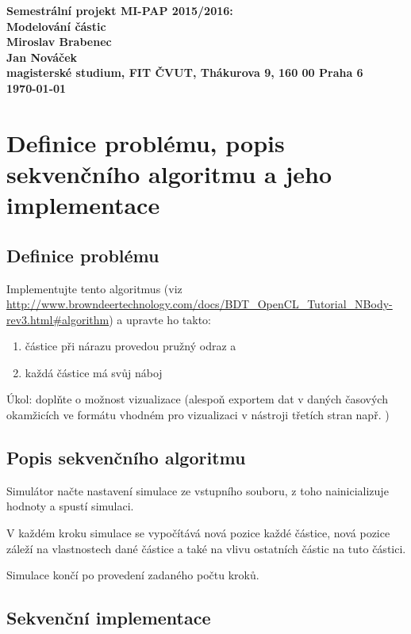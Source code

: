 \documentclass[12pt]{article}
\begin{document}
\begin{center}
\bf Semestrální projekt MI-PAP 2015/2016:\\[5mm]
    Modelování částic\\[5mm]
       Miroslav Brabenec\\
       Jan Nováček\\[2mm]
magisterské studium, FIT ČVUT, Thákurova 9, 160 00 Praha 6\\[2mm]
\today
\end{center}
%
%
%
%
%
\section{Definice problému, popis sekvenčního algoritmu a jeho implementace}

\subsection{Definice problému}
Implementujte tento algoritmus (viz \url{http://www.browndeertechnology.com/docs/BDT_OpenCL_Tutorial_NBody-rev3.html#algorithm}) a upravte ho takto:

\begin{enumerate}
\item	částice při nárazu provedou pružný odraz a
\item	každá částice má svůj náboj
\end{enumerate}

Úkol: doplňte o možnost vizualizace (alespoň exportem dat v daných časových okamžicích ve formátu vhodném pro vizualizaci v nástroji třetích stran např. ) 

\subsection{Popis sekvenčního algoritmu}
Simulátor načte nastavení simulace ze vstupního souboru, z toho nainicializuje hodnoty a spustí simulaci.

V každém kroku simulace se vypočítává nová pozice každé částice, nová pozice záleží na vlastnostech dané částice a také na vlivu ostatních částic na tuto částici.

Simulace končí po provedení zadaného počtu kroků.

\subsection{Sekvenční implementace}
\end{document}
